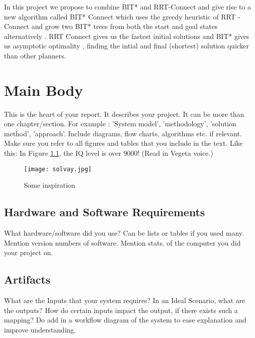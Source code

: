 \documentclass[12pt]{report}
\begin{document}
In this project we propose to combine BIT* and RRT-Connect and give rise to a new algorithm called BIT* Connect which uses the greedy heuristic of RRT - Connect and grow two BIT* trees from both the start and goal states alternatively . RRT Connect gives us the fastest initial solutions and BIT* gives us asymptotic optimality , finding the intial and final (shortest) solution quicker than other planners.









\chapter{Main Body}
This is the heart of your report. It describes your project. It can be more than one chapter/section. For example : 'System model', 'methodology', 'solution method', 'approach'. Include diagrams, flow charts, algorithms etc. if relevant. Make sure you refer to all figures and tables that you include in the text. Like this: In Figure \ref{solvay}, the IQ level is over 9000! (Read in Vegeta voice.)

\begin{figure}[ht]
  \texttt{[image: solvay.jpg]}
  \caption{Some inspiration}
  \label{solvay}
\end{figure}

\section{Hardware and Software Requirements}
What hardware/software did you use? Can be lists or tables if you used many. Mention version numbers of software. Mention stats. of the computer you did your project on. 
\section{Artifacts}
What are the Inputs that your system requires? In an Ideal Scenario, what are the outputs? How do certain inputs impact the output, if there exists such a mapping? Do add in a workflow diagram of the system to ease explanation and improve understanding. 
\end{document}
